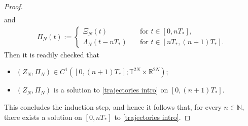 \documentclass[11pt,reqno]{amsart}
\numberwithin{equation}{section}
\begin{document}
\begin{proof}
\begin{align*}
\end{align*}
and 
\begin{align*}
\Pi_{N}(t):=\begin{cases}
\Xi_{N}(t)&\quad\mbox{for $t\in [0,nT_{\ast}]$},\\
\Lambda_{N}(t-nT_{\ast}) &\quad\mbox{for $t\in [nT_{\ast},(n+1)T_{\ast}]$}. 
\end{cases}    
\end{align*}
Then it is readily checked that 
\begin{itemize}
\item[{\rm(a)}] $(Z_{N},\Pi_{N})\in C^{1}([0,(n+1)T_{\ast}];\mathbb{T}^{2N}\times \mathbb{R}^{2N});$
\smallskip
\item[{\rm(b)}] $(Z_{N},\Pi_{N})$ is a solution to \eqref{trajectories intro} on $[0,(n+1)T_{\ast}]$.
\end{itemize}
This concludes the induction step, and hence it follows that, for every $n\in \mathbb{N}$, 
there exists a solution on $[0,nT_{\ast}]$ to \eqref{trajectories intro}. 


\end{proof}
\end{document}
